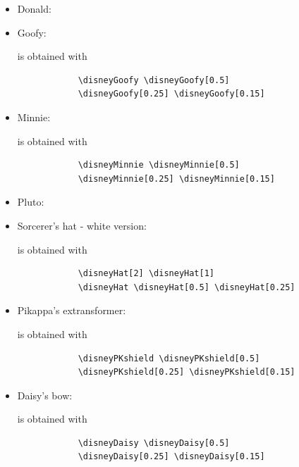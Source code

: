 \documentclass{article}
\begin{document}
\begin{itemize}
    \item Donald: %
    
    \item Goofy: 
        \begin{center}
            \disneyGoofy \disneyGoofy[0.5] \disneyGoofy[0.25] \disneyGoofy[0.15]
        \end{center}
        is obtained with 
        \begin{verbatim}
            \disneyGoofy \disneyGoofy[0.5] 
            \disneyGoofy[0.25] \disneyGoofy[0.15]
        \end{verbatim}
    
    \item Minnie: 
        \begin{center}
            \disneyMinnie \disneyMinnie[0.5] \disneyMinnie[0.25] \disneyMinnie[0.15]
        \end{center}
        is obtained with 
        \begin{verbatim}
            \disneyMinnie \disneyMinnie[0.5] 
            \disneyMinnie[0.25] \disneyMinnie[0.15]
        \end{verbatim}
    
    \item Pluto: %

    \item Sorcerer's hat - white version:
        \begin{center}
            \disneyHat[2] \disneyHat[1] \disneyHat \disneyHat[0.5] \disneyHat[0.25]
        \end{center}
        is obtained with 
        \begin{verbatim}
            \disneyHat[2] \disneyHat[1] 
            \disneyHat \disneyHat[0.5] \disneyHat[0.25]
        \end{verbatim}
    
    \item Pikappa's extransformer:
        \begin{center}
            \disneyPKshield \disneyPKshield[0.5] \disneyPKshield[0.25] \disneyPKshield[0.15]
        \end{center}
        is obtained with 
        \begin{verbatim}
            \disneyPKshield \disneyPKshield[0.5] 
            \disneyPKshield[0.25] \disneyPKshield[0.15]
        \end{verbatim}

    \item Daisy's bow:
        \begin{center}
            \disneyDaisy \disneyDaisy[0.5] \disneyDaisy[0.25] \disneyDaisy[0.15]
        \end{center}
        is obtained with 
        \begin{verbatim}
            \disneyDaisy \disneyDaisy[0.5] 
            \disneyDaisy[0.25] \disneyDaisy[0.15]
        \end{verbatim}
  

\end{itemize}
\end{document}
